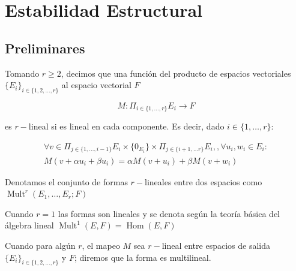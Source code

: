 \chapter{Estabilidad Estructural}

\section{Preliminares}


\begin{defn}
	Tomando $r \geq 2$, decimos que una función del producto de espacios vectoriales $\{ E_i\}_{i \in \{ 1,2,\dots,r\}}$ al espacio vectorial $F$
	
	\begin{equation*}
		\displaystyle M:\Pi _{i \in \{ 1,\dots,r\}} E_i\to F    
	\end{equation*}
	
	es $r-$lineal si es lineal en cada componente. Es decir, dado $i \in \{ 1,\dots, r\}$:
	
	\begin{align*}
		\forall v \in \Pi _{j \in \{ 1,\dots,i-1\}} E_i \times \{ 0_{E_i}\} \times \Pi _{j \in \{ i+1,\dots r\}} E_i, , \forall u_i, w_i \in E_i : \\ 
		M(v +\alpha  u_i  +\beta  u_i) = \alpha M(v +  u_i) + \beta M(v +  w_i)
	\end{align*}
	
	Denotamos el conjunto de formas $r-$lineales entre dos espacios como $\operatorname{Mult}^r(E_1,\dots,E_r;F)$
	
	
\end{defn}

\begin{notn}
	Cuando $r = 1$ las formas son lineales y se denota según la teoría básica del álgebra lineal $\operatorname{Mult}^1(E,F) = \operatorname{Hom}(E,F)$
	
	Cuando para algún $r$, el mapeo $M$ sea $r-$lineal entre espacios de salida $\{ E_i\}_{i \in \{ 1,2,\dots,r\}}$ y $F$; diremos que la forma es multilineal. 
	
\end{notn}

